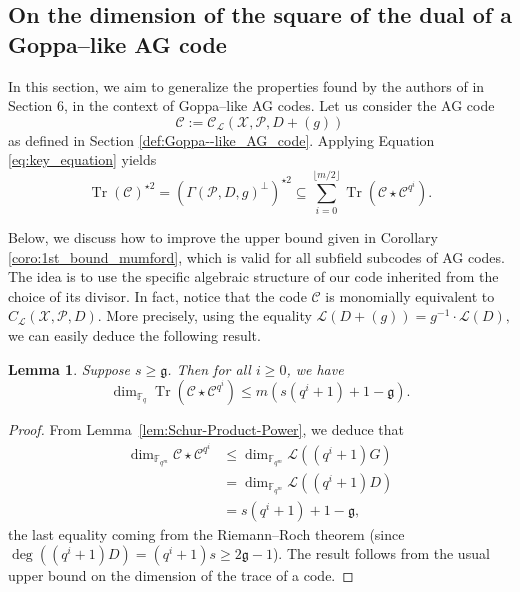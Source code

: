 \documentclass[journal]{IEEEtran}
\theoremstyle{plain}
\newtheorem{lemma}[thm]{Lemma}
\theoremstyle{definition}
\theoremstyle{remark}
\DeclareMathOperator{\trace}{Tr}
\newcommand{\calP}{\mathcal{P}}
\newcommand{\calL}{\mathcal{L}}
\newcommand{\calC}{\mathcal{C}}
\newcommand{\calX}{\mathcal{X}}
\newcommand{\fqm}{\mathbb{F}_{q^m}}
\newcommand{\fq}{\mathbb{F}_{q}}
\newcommand{\Tr}[1]{\trace\!\left(#1\right)}
\begin{document}
	\subsection{On the dimension of the square of the dual of a Goppa--like AG code} \label{section:1st_improvement}
	In this section, we aim to generalize the properties found by the authors of \cite{MT21} in Section 6, in the context of Goppa--like AG codes. Let us consider the AG code 
	$$\calC := \calC_{\calL}(\calX,\calP,D+(g))$$
	as defined in Section \ref{def:Goppa--like_AG_code}. Applying Equation \eqref{eq:key_equation} yields   
	\begin{equation} \label{eq:key_equation_Goppa--like} 
		\Tr{\calC}^{\star 2} = (\Gamma(\calP,D,g)^{\perp})^{\star2} \subseteq \sum\limits_{i=0}^{\lfloor{m/2} \rfloor} \Tr{\calC\star \calC^{q^i}}.
	\end{equation}
	
	Below, we discuss how to improve the upper bound given in Corollary \ref{coro:1st_bound_mumford}, which is valid for all subfield subcodes of AG codes. The idea is to use the specific algebraic structure of our code inherited from the choice of its divisor.
	\noindent In fact, notice that the code $\calC$ is monomially equivalent to $C_{\calL}(\calX,\calP,D)$. 
	More precisely, using the equality $\calL(D+(g)) = g^{-1} \cdot \calL(D),$
	we can easily deduce the following result.
	
	\begin{lemma} \label{lem:bound_dim_Tr(C*C^q^i)}
		Suppose $s \geq \mathfrak{g}$. Then for all $i \geq 0$, we have 
		$$\dim_{\fq} \Tr{\calC\star \calC^{q^i}} \leq m\left(s\left(q^i+1\right)+1-\mathfrak{g}\right).$$
	\end{lemma}
	\begin{proof}
		From Lemma~\ref{lem:Schur-Product-Power}, we deduce that 
		\[
		\begin{aligned}
		\dim_{\fqm} \calC\star \calC^{q^i} &\leq \dim_{\fqm} \calL((q^i+1)G) \\
											&= \dim_{\fqm} \calL((q^i+1)D) \\
											&= s(q^i+1)+1-\mathfrak{g},
		\end{aligned}\]
		the last equality coming from the Riemann--Roch theorem (since $\deg \left((q^i+1)D\right) =(q^i+1)s \geq 2\mathfrak{g}-1$). The result follows from the usual upper bound on the dimension of the trace of a code. 
	\end{proof}
	
\end{document}
